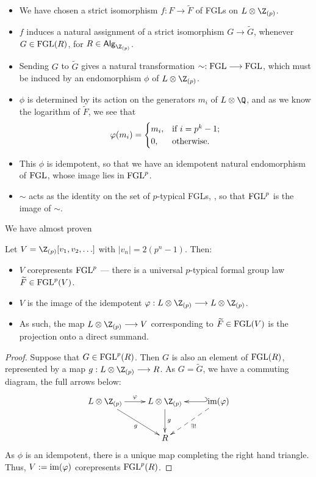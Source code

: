 \documentclass[11pt]{article}
\newcommand{\FGL}{\textup{FGL}}
\newcommand{\FGLp}{\textup{FGL}^{p}}
\newcommand{\ZpAlg}{\textsf{Alg}_{\Z_{(p)}}}
\begin{document}
\begin{Formal Group Laws}
\begin{itemise}
\begin{itemize}
\item We have chosen a strict isomorphism $f:F\to\widetilde{F}$ of FGLs on $L\otimes\Z_{(p)}$. \item $f$ induces a natural assignment of a strict isomorphism $G\to\widetilde{G}$, whenever $G\in\FGL(R)$, for $R\in\ZpAlg$.
\item Sending $G$ to $\widetilde{G}$ gives a natural transformation $\sim:\FGL\to\FGL$, which must be induced by an endomorphism $\phi$ of $L\otimes\Z_{(p)}$.
\item $\phi$ is determined by its action on the generators $m_i$ of ${L}\otimes{\Q}$, and as we know the logarithm of $\widetilde{F}$, we see that
\[\phi(m_i)=\begin{cases}
m_i,&\textup{if }i=p^k-1;\\
0,&\textup{otherwise}.
\end{cases}
\]
\item This $\phi$ is idempotent, so that we have an idempotent natural endomorphism of $\FGL$, whose image lies in $\FGLp$.
\item $\sim$ acts as the identity on the set of $p$-typical FGLs, , so that $\FGLp$ is the image of $\sim$.
\end{itemize}
We have almost proven
\begin{thm*}
Let $V=\Z_{(p)}[v_1,v_2,\ldots]$ with $|v_n|=2(p^n-1)$. Then:
\begin{itemize}\squishlist
\item  $V$ corepresents $\FGLp$ --- there is a universal $p$-typical formal group law $\widetilde{F}\in\FGLp(V)$.
\item $V$ is the image of the idempotent $\phi:{L}\otimes{\Z_{(p)}}\to{L}\otimes{\Z_{(p)}}$.
\item As such, the map ${L}\otimes{\Z_{(p)}}\to V$ corresponding to $\widetilde{F}\in\FGL(V)$ is the projection onto a direct summand.
\end{itemize}
\end{thm*}
\begin{proof}
Suppose that $G\in\FGLp(R)$. Then $G$ is also an element of $\FGL(R)$, represented by a map $g:L\otimes\Z_{(p)}\to R$. As $G=\widetilde{G}$, we have a commuting diagram, the full arrows below:
\[\xymatrix@R=1cm{
L\otimes\Z_{(p)}\ar[r]^-{\phi}\ar[dr]_-{g}&%
L\otimes\Z_{(p)}\ar[d]^-{g}&
\im(\phi)\ar@{_{(}->}[l]\ar@{-->}[ld]^-{\exists !}\\
&%
R%
}\]
As $\phi$ is an idempotent, there is a unique map completing the right hand triangle. Thus, $V:=\im(\phi)$ corepresents $\FGLp(R)$.
\end{proof}

\end{itemise}
\end{Formal Group Laws}
\end{document}
